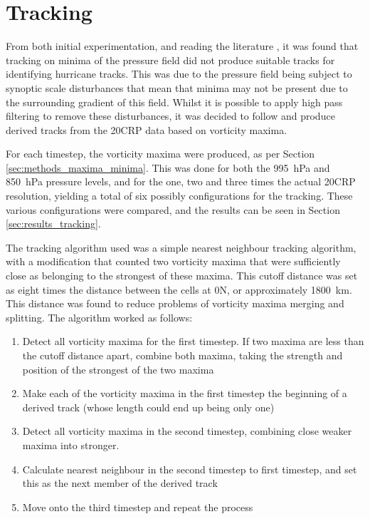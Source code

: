 \documentclass[pdftex,12pt,a4paper]{report}
\begin{document}
\section{Tracking}

From both initial experimentation, and reading the literature \parencite{TODOmultiple}, it was found that tracking on minima of the pressure field did not produce suitable tracks for identifying hurricane tracks. This was due to the pressure field being subject to synoptic scale disturbances that mean that minima may not be present due to the surrounding gradient of this field. Whilst it is possible to apply high pass filtering to remove these disturbances, it was decided to follow \textcite{TODOmutliple} and produce derived tracks from the 20CRP data based on vorticity maxima.

For each timestep, the vorticity maxima were produced, as per Section \ref{sec:methods_maxima_minima}. This was done for both the \SI{995}{hPa} and \SI{850}{hPa} pressure levels, and for the one, two and three times the actual 20CRP resolution, yielding a total of six possibly configurations for the tracking. These various configurations were compared, and the results can be seen in Section \ref{sec:results_tracking}.

The tracking algorithm used was a simple nearest neighbour tracking algorithm, with a modification that counted two vorticity maxima that were sufficiently close as belonging to the strongest of these maxima. This cutoff distance was set as eight times the distance between the cells at 0\textdegree N, or approximately \SI{1800}{km}. This distance was found to reduce problems of vorticity maxima merging and splitting. The algorithm worked as follows:

\begin{enumerate}
    \item Detect all vorticity maxima for the first timestep. If two maxima are less than the cutoff distance apart, combine both maxima, taking the strength and position of the strongest of the two maxima
    \item Make each of the vorticity maxima in the first timestep the beginning of a derived track (whose length could end up being only one)
    \item Detect all vorticity maxima in the second timestep, combining close weaker maxima into stronger.
    \item Calculate nearest neighbour in the second timestep to first timestep, and set this as the next member of the derived track
    \item Move onto the third timestep and repeat the process
\end{enumerate}
\end{document}
